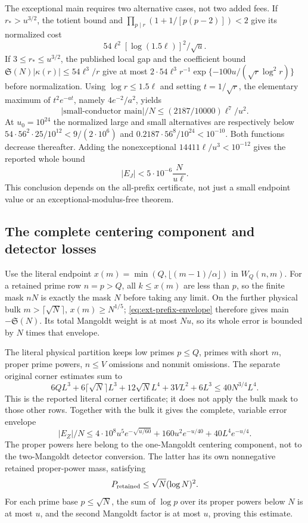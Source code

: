 \documentclass[11pt,a4paper]{article}
\theoremstyle{definition}
\theoremstyle{remark}
\begin{document}
The exceptional main requires two alternative cases, not two added
fees. If $r_*>u^{3/2}$, the totient bound and
$\prod_{p\mid r}(1+1/[p(p-2)])<2$ give its normalized cost
\[
 54\ell^2[\log(1.5\ell)]^2/\sqrt u.
\]
If $3\leq r_*\leq u^{3/2}$, the published local gap and the
coefficient bound $\mathfrak S(N)|\kappa(r)|\leq54\ell^3/r$
give at most $2\cdot54\ell^3r^{-1}
\exp\{-100u/(\sqrt r\log^2r)\}$ before normalization.
Using $\log r\leq1.5\ell$ and setting $t=1/\sqrt r$, the
elementary maximum of $t^2e^{-at}$, namely $4e^{-2}/a^2$, yields
\[
 |\text{small-conductor main}|/N
          \leq(2187/10000)\ell^7/u^2.
\]
At $u_0=10^{24}$ the normalized large and small alternatives are
respectively below
$54\cdot56^2\cdot25/10^{12}<9/(2\cdot10^6)$ and
$0.2187\cdot56^8/10^{24}<10^{-10}$.
Both functions decrease thereafter. Adding the nonexceptional
$14411\ell/u^3<10^{-12}$ gives the reported whole bound
\[
          |E_J|<5\cdot10^{-6}\frac{N}{u\ell}.
\]
This conclusion depends on the all-prefix certificate, not just a
small endpoint value or an exceptional-modulus-free theorem.

\subsection{The complete centering component and detector losses}

Use the literal endpoint
$x(m)=\min(Q,\lfloor(m-1)/\alpha\rfloor)$ in $W_Q(n,m)$.
For a retained prime row $n=p>Q$, all $k\leq x(m)$ are less than
$p$, so the finite mask $nN$ is exactly the mask $N$ before taking
any limit. On the further physical bulk $m>\lceil\sqrt N\rceil$,
$x(m)\geq N^{1/5}$; \eqref{eq:ext-prefix-envelope} therefore gives
main $-\mathfrak S(N)$. Its total Mangoldt weight is at most $Nu$,
so its whole error is bounded by $N$ times that envelope.

The literal physical partition keeps low primes $p\leq Q$, primes
with short $m$, proper prime powers, $n\leq V$ omissions and nonunit
omissions. The separate original corner estimates sum to
\[
 6QL^3+6\lceil\sqrt N\rceil L^3+12\sqrt N L^4
                      +3VL^2+6L^3\leq40N^{3/4}L^4.
\]
This is the reported literal corner certificate; it does not apply
the bulk mask to those other rows. Together with the bulk it gives
the complete, variable error envelope
\begin{equation}\label{eq:ext-EZ}
 |E_Z|/N\leq4\cdot10^8u^5e^{-\sqrt{u/60}}
                +160u^2e^{-u/40}+40L^4e^{-u/4}.
\end{equation}
The proper powers here belong to the one-Mangoldt centering component,
not to the two-Mangoldt detector conversion. The latter has its own
nonnegative retained proper-power mass, satisfying
\[
 P_{\rm retained}\leq\sqrt N(\log N)^2.
\]
For each prime base $p\leq\sqrt N$, the sum of $\log p$ over its
proper powers below $N$ is at most $u$, and the second Mangoldt
factor is at most $u$, proving this estimate.
\end{document}
